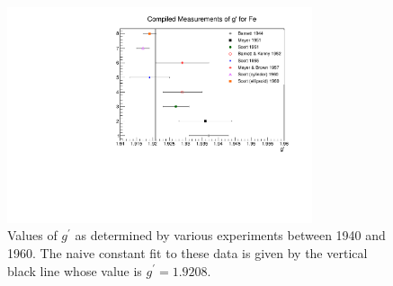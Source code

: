 \documentclass[12pt]{article}
\begin{document}
\begin{figure}[h]
\centering
\includegraphics[width=0.8\textwidth]{gprime_world_data_Fe.pdf}
\caption{Values of $g^{\prime}$ as determined by various experiments between 1940 and 1960. The naive constant fit to these data is given by the vertical black line whose value is $g^{\prime}=1.9208$.}
\label{fig:gprime_world_data_Fe}
\end{figure}
\end{document}
